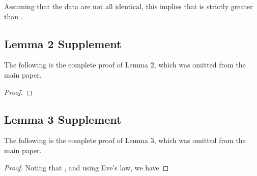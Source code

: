 \documentclass[runningheads]{llncs}
\begin{document}
Assuming that the data are not all identical, this implies that  is strictly greater than .


\subsection{Lemma 2 Supplement}\vspace*{-1ex}
The following is the complete proof of Lemma 2, which was omitted from the main paper.

\begin{proof} 

\end{proof}

\subsection{Lemma 3 Supplement}
The following is the complete proof of Lemma 3, which was omitted from the main paper.

\begin{proof}

Noting that , and using Eve's law, we have

\end{proof}
\end{document}
